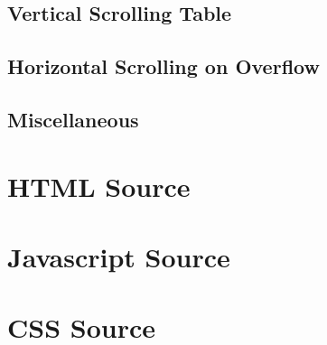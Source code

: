 \documentclass[letterpaper]{article}
\begin{document}
\subsection{Vertical Scrolling Table}

\subsection{Horizontal Scrolling on Overflow}

\subsection{Miscellaneous}

\newpage

\appendix
\section{HTML Source}


\newpage

\section{Javascript Source}


\newpage

\section{CSS Source}

\end{document}
